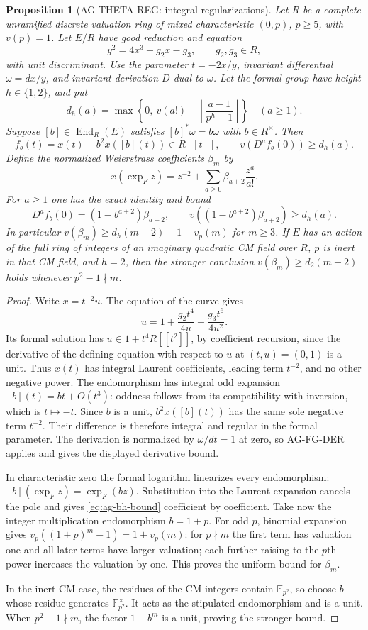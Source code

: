 \documentclass[11pt,a4paper]{article}
\newtheorem{proposition}{Proposition}
\begin{document}
\begin{proposition}[AG-THETA-REG: integral regularizations]
Let $R$ be a complete unramified discrete valuation ring of mixed
characteristic $(0,p)$, $p\ge5$, with $v(p)=1$. Let $E/R$ have good
reduction and equation
\[
 y^2=4x^3-g_2x-g_3,\qquad g_2,g_3\in R,
\]
with unit discriminant. Use the parameter $t=-2x/y$, invariant
differential $\omega=dx/y$, and invariant derivation $D$ dual to
$\omega$. Let the formal group have height $h\in\{1,2\}$, and put
\[
 d_h(a)=\max\left\{0,\ v(a!)-
                   \left\lfloor\frac{a-1}{p^h-1}\right\rfloor\right\}
 \quad(a\ge1).
\]
Suppose $[b]\in\operatorname{End}_R(E)$ satisfies
$[b]^*\omega=b\omega$ with $b\in R^\times$. Then
\[
 f_b(t)=x(t)-b^2x([b](t))\in R[[t]],\qquad
 v(D^a f_b(0))\ge d_h(a).
\]
Define the normalized Weierstrass coefficients $\beta_m$ by
\[
 x(\exp_F z)=z^{-2}+\sum_{a\ge0}\beta_{a+2}\frac{z^a}{a!}.
\]
For $a\ge1$ one has the exact identity and bound
\begin{equation}\label{eq:ag-bh-bound}
 D^a f_b(0)=(1-b^{a+2})\beta_{a+2},\qquad
 v((1-b^{a+2})\beta_{a+2})\ge d_h(a).
\end{equation}
In particular
$v(\beta_m)\ge d_h(m-2)-1-v_p(m)$ for $m\ge3$.
If $E$ has an action of the full ring of integers of an imaginary
quadratic CM field over $R$, $p$ is
inert in that CM field, and $h=2$, then the stronger conclusion
$v(\beta_m)\ge d_2(m-2)$ holds whenever $p^2-1\nmid m$.
\end{proposition}
\begin{proof}
Write $x=t^{-2}u$. The equation of the curve gives
\[
 u=1+\frac{g_2t^4}{4u}+\frac{g_3t^6}{4u^2}.
\]
Its formal solution has $u\in1+t^4R[[t^2]]$, by coefficient
recursion, since the derivative of the defining equation with
respect to $u$ at $(t,u)=(0,1)$ is a unit. Thus $x(t)$ has integral
Laurent coefficients, leading term $t^{-2}$, and no other negative
power. The endomorphism has integral odd expansion
$[b](t)=bt+O(t^3)$: oddness follows from its compatibility with
inversion, which is $t\mapsto-t$. Since $b$ is a unit,
$b^2x([b](t))$ has the same sole negative term $t^{-2}$.
Their difference is therefore integral and regular in the formal
parameter. The derivation is normalized by $\omega/dt=1$ at zero,
so AG-FG-DER applies and gives the displayed derivative bound.

In characteristic zero the formal logarithm linearizes every
endomorphism: $[b](\exp_F z)=\exp_F(bz)$. Substitution into the
Laurent expansion cancels the pole and gives
\eqref{eq:ag-bh-bound} coefficient by coefficient.
Take now the integer multiplication endomorphism $b=1+p$.
For odd $p$, binomial expansion gives
$v_p((1+p)^m-1)=1+v_p(m)$: for $p\nmid m$ the first term
has valuation one and all later terms have larger valuation;
each further raising to the $p$th power increases the valuation
by one. This proves the uniform bound for $\beta_m$.

In the inert CM case, the residues of the CM integers contain
$\mathbb F_{p^2}$, so choose $b$ whose residue generates
$\mathbb F_{p^2}^{\times}$. It acts as the stipulated
endomorphism and is a unit. When $p^2-1\nmid m$, the factor
$1-b^m$ is a unit, proving the stronger bound.
\end{proof}
\end{document}
